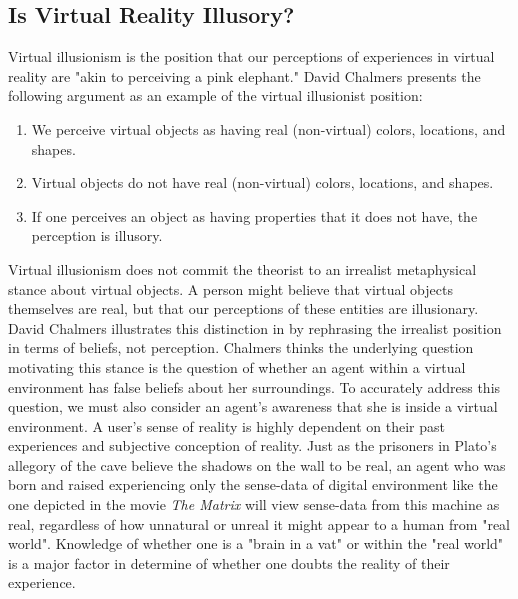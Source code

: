 \subsection{Is Virtual Reality Illusory?}
Virtual illusionism is the position that our perceptions of experiences in virtual reality are "akin to perceiving a pink elephant." \cite{ChalmersVR} 
David Chalmers presents the following argument as an example of the virtual illusionist position: 
\begin{enumerate}
	\item We perceive virtual objects as having real (non-virtual) colors, locations, and
shapes.
\item Virtual objects do not have real (non-virtual) colors, locations, and shapes.
\item If one perceives an object as having properties that it does not have, the perception
is illusory.
\end{enumerate}
Virtual illusionism does  not commit the theorist to an irrealist metaphysical stance about virtual objects. A person might believe that virtual objects themselves are real, but that our perceptions of these entities are illusionary. David Chalmers illustrates this distinction in \cite{ChalmersVR} by rephrasing the irrealist position in terms of beliefs, not perception. Chalmers thinks the underlying question motivating this stance is the question of whether an agent within a virtual environment has false beliefs about her surroundings. To accurately address this question, we must also consider an agent's awareness that she is inside a virtual environment. 
 A user's sense of reality is highly dependent on their past experiences and subjective conception of reality. Just as the prisoners in Plato's  allegory of the cave believe the shadows on the wall to be real, an agent who was born and raised experiencing only the sense-data of digital environment like the one depicted in the movie \textit{The Matrix} will view sense-data from this machine as real, regardless of how unnatural or unreal it might appear to a human from "real world". Knowledge of whether one is a "brain in a vat" or within the "real world" is a major factor in determine of whether one doubts the reality of their experience. 
 
